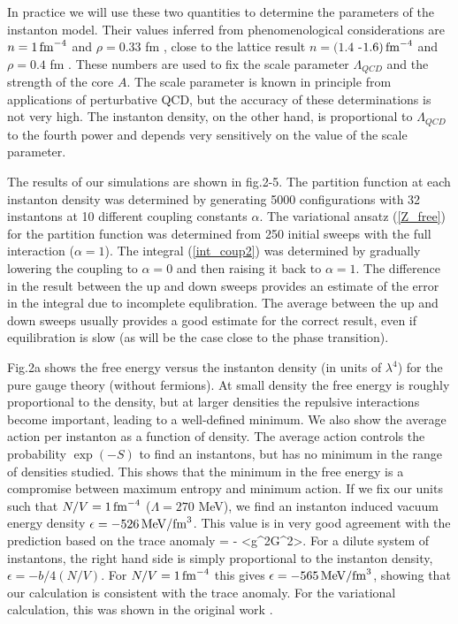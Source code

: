    In practice we will use these two quantities to determine the
parameters of the instanton model. Their values inferred from
phenomenological considerations are $n=1\,{\rm fm}^{-4}$ and
$\rho=0.33$ fm \cite{Shu_82}, close to the lattice result $n=(1.4$
-$1.6)\,{\rm fm}^{-4}$ and $\rho=0.4$ fm \cite{CGHN_94}. These
numbers are used to fix the scale parameter $\Lambda_{QCD}$
and the strength of the core $A$. The scale parameter is known
in principle from applications of perturbative QCD, but the
accuracy of these determinations is not very high. The instanton
density, on the other hand, is proportional to $\Lambda_{QCD}$ to the
fourth power and depends very sensitively on the value of the
scale parameter.

   The results of our simulations are shown in fig.2-5. The partition
function at each instanton density was determined by generating
5000 configurations with 32 instantons at 10 different coupling
constants $\alpha$. The variational ansatz (\ref{Z_free}) for
the partition function was determined from 250 initial sweeps with
the full interaction ($\alpha=1$). The integral (\ref{int_coup2})
was determined by gradually lowering the coupling to $\alpha=0$
and then raising it back to $\alpha=1$. The difference in the
result between the up and down sweeps provides an estimate of
the error in the integral due to incomplete equlibration. The
average between the up and down sweeps usually provides a good
estimate for the correct result, even if equilibration is slow
(as will be the case close to the phase transition).

  Fig.2a shows the free energy versus the instanton density (in units
of $\lambda^4$) for the pure gauge theory (without fermions). At small
density the free energy is roughly proportional to the density, but at
larger densities the repulsive interactions become important, leading to
a well-defined minimum. We also show the average action per instanton
as a function of density. The average action controls the probability
$\exp(-S)$ to find an instantons, but has no minimum in the range of
densities studied. This shows that the minimum in the free energy is a
compromise between maximum entropy and minimum action. If we fix our
units such that $N/V=1\,{\rm fm}^{-4}$ ($\Lambda=270$ MeV), we find
an instanton induced vacuum energy density $\epsilon=-526\,{\rm MeV}/
{\rm fm}^3$. This value is in very good agreement with the prediction
based on the trace anomaly
\be
\label{trace}
\epsilon = - <g^2G^2>.
\ee
For a dilute system of instantons, the right hand side is simply
proportional to the instanton density, $\epsilon=-b/4(N/V)$. For
$N/V=1\,{\rm fm}^{-4}$ this gives $\epsilon=-565\,{\rm MeV}/{\rm
fm}^3$, showing that our calculation is consistent with the trace
anomaly. For the variational calculation, this was shown in the
original work \cite{DP_84}.

